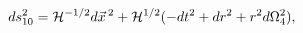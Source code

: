 \begin{equation}
ds_{10}^2={\cal H}^{-1/2}d\vec x\,^2+{\cal H}^{1/2}(-dt^2+dr^2+r^2d\Omega_4^2),
\end{equation}

